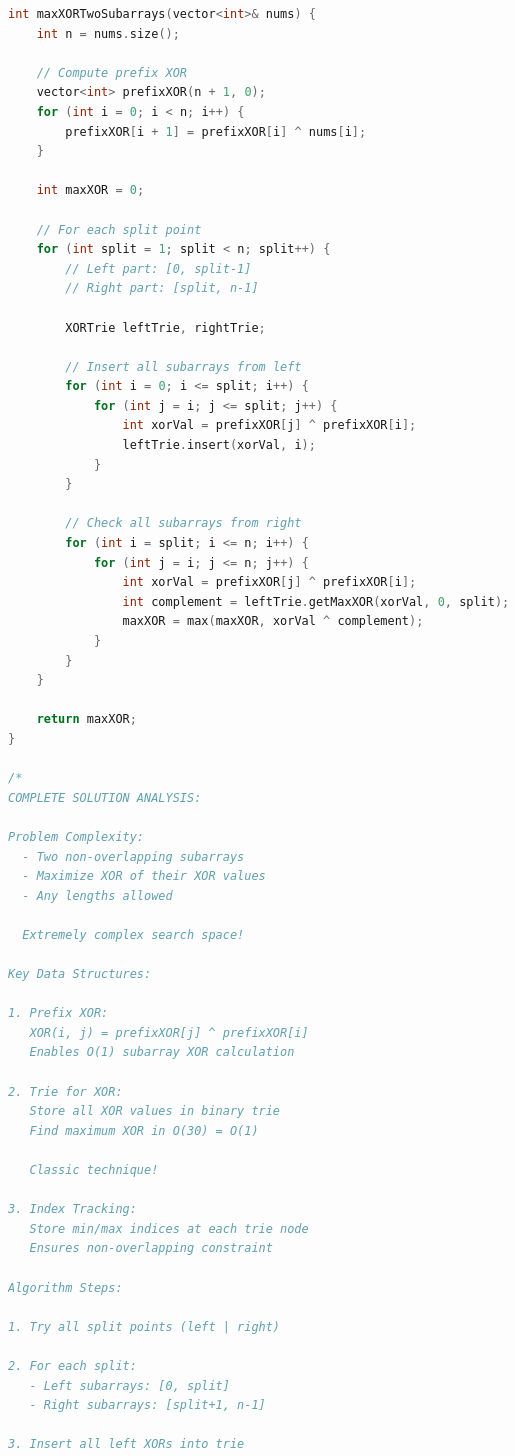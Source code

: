 \documentclass[11pt,a4paper,oneside]{book}
\begin{document}
\begin{lstlisting}[language=C++, caption=ELITE Problem 1 - Multi-Dimensional Binary Search]
int maxXORTwoSubarrays(vector<int>& nums) {
    int n = nums.size();
    
    // Compute prefix XOR
    vector<int> prefixXOR(n + 1, 0);
    for (int i = 0; i < n; i++) {
        prefixXOR[i + 1] = prefixXOR[i] ^ nums[i];
    }
    
    int maxXOR = 0;
    
    // For each split point
    for (int split = 1; split < n; split++) {
        // Left part: [0, split-1]
        // Right part: [split, n-1]
        
        XORTrie leftTrie, rightTrie;
        
        // Insert all subarrays from left
        for (int i = 0; i <= split; i++) {
            for (int j = i; j <= split; j++) {
                int xorVal = prefixXOR[j] ^ prefixXOR[i];
                leftTrie.insert(xorVal, i);
            }
        }
        
        // Check all subarrays from right
        for (int i = split; i <= n; i++) {
            for (int j = i; j <= n; j++) {
                int xorVal = prefixXOR[j] ^ prefixXOR[i];
                int complement = leftTrie.getMaxXOR(xorVal, 0, split);
                maxXOR = max(maxXOR, xorVal ^ complement);
            }
        }
    }
    
    return maxXOR;
}

/*
COMPLETE SOLUTION ANALYSIS:

Problem Complexity:
  - Two non-overlapping subarrays
  - Maximize XOR of their XOR values
  - Any lengths allowed
  
  Extremely complex search space!

Key Data Structures:

1. Prefix XOR:
   XOR(i, j) = prefixXOR[j] ^ prefixXOR[i]
   Enables O(1) subarray XOR calculation

2. Trie for XOR:
   Store all XOR values in binary trie
   Find maximum XOR in O(30) = O(1)
   
   Classic technique!

3. Index Tracking:
   Store min/max indices at each trie node
   Ensures non-overlapping constraint

Algorithm Steps:

1. Try all split points (left | right)

2. For each split:
   - Left subarrays: [0, split]
   - Right subarrays: [split+1, n-1]
   
3. Insert all left XORs into trie


\end{lstlisting}
\end{document}
